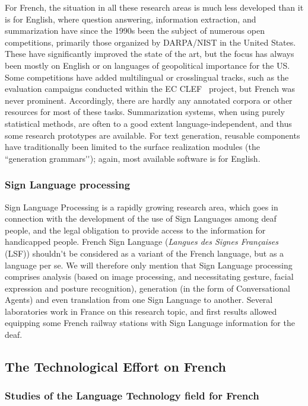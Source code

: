 \documentclass[]{../metanetpaper}
\begin{document}
\begin{multicols}{2}
For French, the situation in all these research areas is much less
developed than it is for English, where question answering,
information extraction, and summarization have since the 1990s been
the subject of numerous open competitions, primarily those organized
by DARPA/NIST in the United States. These have significantly improved
the state of the art, but the focus has always been mostly on English
or on languages of geopolitical importance for the US. Some
competitions have added multilingual or crosslingual tracks, such as
the evaluation campaigns conducted within the EC CLEF~\cite{clef}
project, but French was never prominent. Accordingly, there are hardly
any annotated corpora or other resources for most of these
tasks. Summarization systems, when using purely statistical methods,
are often to a good extent language-independent, and thus some
research prototypes are available. For text generation, reusable
components have traditionally been limited to the surface realization
modules (the ``generation grammars{\mbox '}{\mbox '}); again, most available software is
for English.

\subsubsection{Sign Language processing}

Sign Language Processing is a rapidly growing research area, which
goes in connection with the development of the use of Sign Languages
among deaf people, and the legal obligation to provide access to the
information for handicapped people. French Sign Language ({\em Langues des
Signes Françaises} (LSF)) shouldn{\mbox '}t be considered as a variant of the
French language, but as a language per se. We will therefore only
mention that Sign Language processing comprises analysis (based on
image processing, and necessitating gesture, facial expression and
posture recognition), generation (in the form of Conversational
Agents) and even translation from one Sign Language to
another. Several laboratories work in France on this research topic,
and first results allowed equipping some French railway stations with
Sign Language information for the deaf.

\subsection{The Technological Effort on French}

\subsubsection{Studies of the Language Technology field for French}


\end{multicols}
\end{document}
